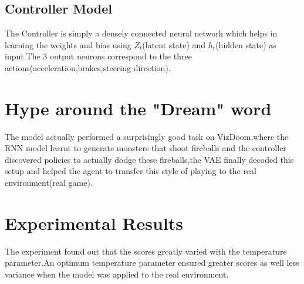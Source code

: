 \documentclass{article}
\begin{document}
\subsection{Controller Model}
The Controller is simply a densely connected neural network which helps in learning the weights and bias using $Z_t$(latent state) and $h_t$(hidden state) as input.The 3 output neurons correspond to the three actions(acceleration,brakes,steering direction).
\section{Hype around the "Dream" word}
The model actually performed a surprisingly good task on VizDoom,where the RNN model learnt to generate monsters that shoot fireballs and the controller discovered policies to actually dodge these fireballs,the VAE finally decoded this setup and helped the agent to transfer this style of playing to the real environment(real game). 
\section{Experimental Results}
The experiment found out that the scores greatly varied with the temperature parameter.An optimum temperature parameter ensured greater scores as well less variance when the model was applied to the real environment.
\end{document}
